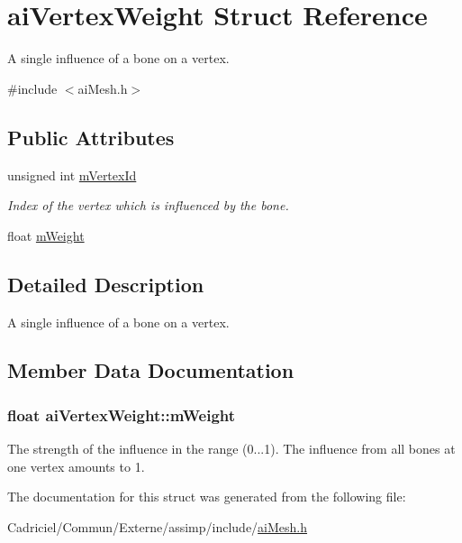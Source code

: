 \hypertarget{structai_vertex_weight}{\section{ai\-Vertex\-Weight Struct Reference}
\label{structai_vertex_weight}
}


A single influence of a bone on a vertex.  




{\ttfamily \#include $<$ai\-Mesh.\-h$>$}

\subsection*{Public Attributes}
\begin{DoxyCompactItemize}
\item 
\hypertarget{structai_vertex_weight_af6269cf6a0f02e5ae870a72046d58f4f}{unsigned int \hyperlink{structai_vertex_weight_af6269cf6a0f02e5ae870a72046d58f4f}{m\-Vertex\-Id}}\label{structai_vertex_weight_af6269cf6a0f02e5ae870a72046d58f4f}

\begin{DoxyCompactList}\small\item\em Index of the vertex which is influenced by the bone. \end{DoxyCompactList}\item 
float \hyperlink{structai_vertex_weight_abab9c49baabc2cafef9ac840f59e61b8}{m\-Weight}
\end{DoxyCompactItemize}


\subsection{Detailed Description}
A single influence of a bone on a vertex. 

\subsection{Member Data Documentation}
\hypertarget{structai_vertex_weight_abab9c49baabc2cafef9ac840f59e61b8}{
\subsubsection[{m\-Weight}]{\setlength{\rightskip}{0pt plus 5cm}float ai\-Vertex\-Weight\-::m\-Weight}}\label{structai_vertex_weight_abab9c49baabc2cafef9ac840f59e61b8}
The strength of the influence in the range (0...1). The influence from all bones at one vertex amounts to 1. 

The documentation for this struct was generated from the following file\-:\begin{DoxyCompactItemize}
\item 
Cadriciel/\-Commun/\-Externe/assimp/include/\hyperlink{ai_mesh_8h}{ai\-Mesh.\-h}\end{DoxyCompactItemize}
